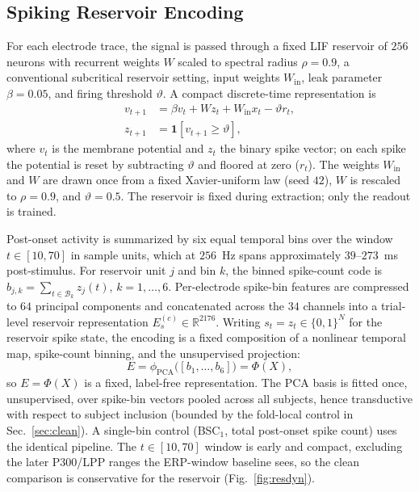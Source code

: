 \documentclass[conference]{IEEEtran}
\newcommand{\R}{\mathbb{R}}
\newcommand{\Ind}{\mathbf{1}}
\begin{document}
\subsection{Spiking Reservoir Encoding}
For each electrode trace, the signal is passed through a fixed LIF reservoir of $256$ neurons with recurrent weights $W$ scaled to spectral radius $\rho=0.9$, a conventional subcritical reservoir setting, input weights $W_{\mathrm{in}}$, leak parameter $\beta=0.05$, and firing threshold $\vartheta$. A compact discrete-time representation is
\begin{align}
    v_{t+1} &= \beta v_t + W z_t + W_{\mathrm{in}}x_t - \vartheta r_t, \\
    z_{t+1} &= \Ind[v_{t+1}\geq \vartheta],
\end{align}
where $v_t$ is the membrane potential and $z_t$ the binary spike vector; on each spike the potential is reset by subtracting $\vartheta$ and floored at zero ($r_t$). The weights $W_{\mathrm{in}}$ and $W$ are drawn once from a fixed Xavier-uniform law (seed $42$), $W$ is rescaled to $\rho=0.9$, and $\vartheta=0.5$. The reservoir is fixed during extraction; only the readout is trained.

Post-onset activity is summarized by six equal temporal bins over the window $t\in[10,70]$ in sample units, which at $256$~Hz spans approximately $39$--$273$~ms post-stimulus. For reservoir unit $j$ and bin $k$, the binned spike-count code is $b_{j,k}=\sum_{t\in\mathcal{B}_k} z_j(t)$, $k=1,\ldots,6$. Per-electrode spike-bin features are compressed to $64$ principal components and concatenated across the $34$ channels into a trial-level reservoir representation $E_s^{(c)}\in\R^{2176}$. Writing $s_t=z_t\in\{0,1\}^{N}$ for the reservoir spike state, the encoding is a fixed composition of a nonlinear temporal map, spike-count binning, and the unsupervised projection:
\begin{equation}\label{eq:operator}
E=\phi_{\mathrm{PCA}}\!\big([b_1,\dots,b_6]\big)=\Phi(X),
\end{equation}
so $E=\Phi(X)$ is a fixed, label-free representation. The PCA basis is fitted once, unsupervised, over spike-bin vectors pooled across all subjects, hence transductive with respect to subject inclusion (bounded by the fold-local control in Sec.~\ref{sec:clean}). A single-bin control (BSC$_1$, total post-onset spike count) uses the identical pipeline. The $t\in[10,70]$ window is early and compact, excluding the later P300/LPP ranges the ERP-window baseline sees, so the clean comparison is conservative for the reservoir (Fig.~\ref{fig:resdyn}).
\end{document}
